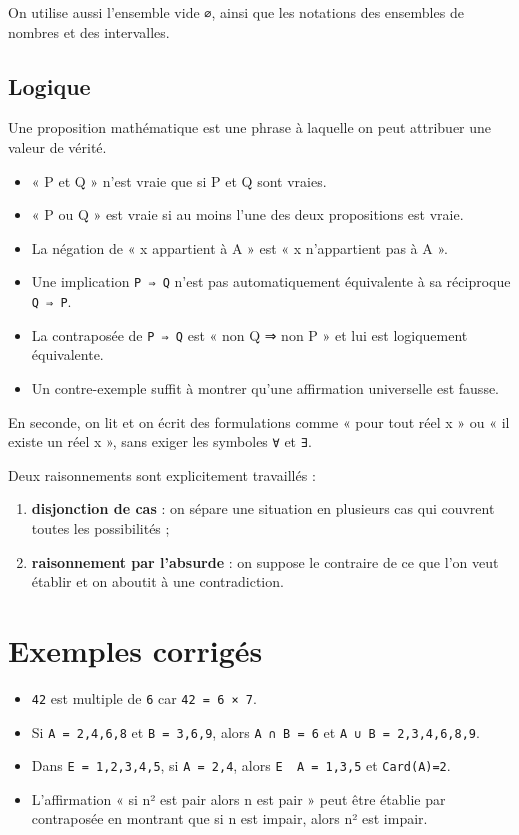 On utilise aussi l'ensemble vide \texttt{∅}, ainsi que les notations des ensembles de nombres et des intervalles.

\subsection{Logique}

Une proposition mathématique est une phrase à laquelle on peut attribuer une valeur de vérité.

\begin{itemize}
\item « P et Q » n'est vraie que si P et Q sont vraies.
\item « P ou Q » est vraie si au moins l'une des deux propositions est vraie.
\item La négation de « x appartient à A » est « x n'appartient pas à A ».
\item Une implication \texttt{P ⇒ Q} n'est pas automatiquement équivalente à sa réciproque \texttt{Q ⇒ P}.
\item La contraposée de \texttt{P ⇒ Q} est « non Q ⇒ non P » et lui est logiquement équivalente.
\item Un contre-exemple suffit à montrer qu'une affirmation universelle est fausse.
\end{itemize}

En seconde, on lit et on écrit des formulations comme « pour tout réel x » ou « il existe un réel x », sans exiger les symboles \texttt{∀} et \texttt{∃}.

Deux raisonnements sont explicitement travaillés :

\begin{enumerate}
\item \textbf{disjonction de cas} : on sépare une situation en plusieurs cas qui couvrent toutes les possibilités ;
\item \textbf{raisonnement par l'absurde} : on suppose le contraire de ce que l'on veut établir et on aboutit à une contradiction.
\end{enumerate}

\section{Exemples corrigés}

\begin{itemize}
\item \texttt{42} est multiple de \texttt{6} car \texttt{42 = 6 × 7}.
\item Si \texttt{A = {2,4,6,8}} et \texttt{B = {3,6,9}}, alors \texttt{A ∩ B = {6}} et \texttt{A ∪ B = {2,3,4,6,8,9}}.
\item Dans \texttt{E = {1,2,3,4,5}}, si \texttt{A = {2,4}}, alors \texttt{E \ A = {1,3,5}} et \texttt{Card(A)=2}.
\item L'affirmation « si n² est pair alors n est pair » peut être établie par contraposée en montrant que si n est impair, alors n² est impair.
\end{itemize}

